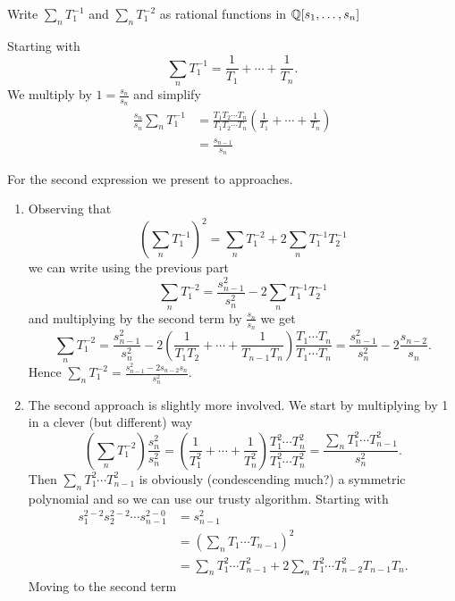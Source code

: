     \begin{ex}{14.23}
        Write $\sum_{n}T_1^{-1}$ and $\sum_n T_1^{-2}$ as rational functions in $\mathbb{Q}[s_1,\dots,s_n]$
    \end{ex}
    \begin{sol}
        Starting with
        $$
            \sum_{n}T_1^{-1}=\frac{1}{T_1}+\cdots+\frac{1}{T_n}.
        $$
        We multiply by $1=\frac{s_n}{s_n}$ and simplify
        \begin{align*}
            \frac{s_n}{s_n}\sum_{n}T_1^{-1}&=\frac{T_1T_2\cdots T_n}{T_1T_2\cdots T_n}\left(\frac{1}{T_1}+\cdots+\frac{1}{T_n}\right)\\
            &=\frac{s_{n-1}}{s_n}
        \end{align*}

        For the second expression we present to approaches.
        \begin{enumerate}
            \item Observing that 
                $$\left(\sum_n T_1^{-1}\right)^2=\sum_{n} T_1^{-2}+2\sum_{n}T_1^{-1}T_2^{-1}$$
            we can write using the previous part
                $$ \sum_n T_1^{-2} = \frac{s_{n-1}^2}{s_n^2}-2\sum_{n}T_1^{-1}T_2^{-1}$$
            and multiplying by the second term by $\frac{s_{n}}{s_{n}}$ we get
                $$ \sum_n T_1^{-2} = \frac{s_{n-1}^2}{s_n^2} - 2\left(\frac{1}{T_1T_2}+\cdots+\frac{1}{T_{n-1}T_n}\right)\frac{T_1\cdots T_n}{T_1\cdots T_n}=\frac{s_{n-1}^2}{s_n^2} - 2\frac{s_{n-2}}{s_n}.$$
            Hence $\sum_n T_1^{-2}=\frac{s_{n-1}^2-2s_{n-2}s_n}{s_n^2}$.
            \item The second approach is slightly more involved. We start by multiplying by 1 in a clever (but different) way
                $$\left(\sum_n T_1^{-2}\right)\frac{s_n^2}{s_n^2}=\left(\frac{1}{T_1^2}+\cdots+\frac{1}{T_n^2}\right)\frac{T_1^2\cdots T_n^2}{T_1^2\cdots T_n^2}=\frac{\sum_n T_1^2\cdots T_{n-1}^2}{s_n^2}.$$
            Then $\sum_n T_1^2\cdots T_{n-1}^2$ is obviously (condescending much?) a symmetric polynomial and so we can use our trusty algorithm. Starting with
            \begin{align*}
                s_1^{2-2}s_2^{2-2}\cdots s_{n-1}^{2-0}&=s_{n-1}^2\\
                &=\left(\sum_n T_1\cdots T_{n-1}\right)^2\\
                &=\sum_n T_1^2\cdots T_{n-1}^2 + 2\sum_n T_1^2\cdots T_{n-2}^2T_{n-1}T_n.
            \end{align*}
            Moving to the second term

\end{enumerate}
\end{sol}
